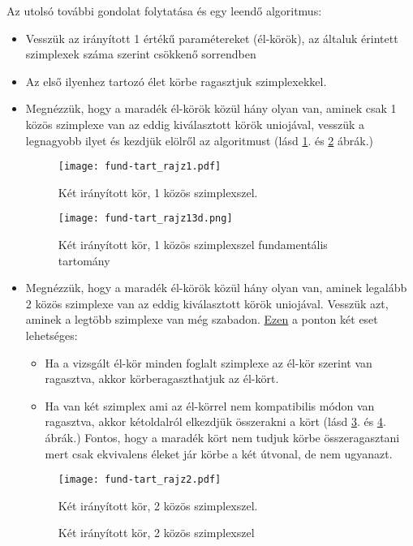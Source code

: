 \documentclass[12pt,magyar,a4paper]{article}
\begin{document}
Az utolsó további gondolat folytatása és egy leendő algoritmus:
\begin{itemize}
  \item Vesszük az irányított 1 értékű paramétereket (él-körök), az általuk
    érintett szimplexek száma szerint csökkenő sorrendben
  \item Az első ilyenhez tartozó élet körbe ragasztjuk szimplexekkel.
  \item Megnézzük, hogy a maradék él-körök közül hány olyan van, aminek csak 1
    közös szimplexe van az eddig kiválasztott körök uniojával, vesszük a
    legnagyobb ilyet és kezdjük elölről az algoritmust (lásd \ref{ftrajz1}. és
    \ref{ftrajz13d} ábrák.)
    \begin{figure}
      \caption{\label{ftrajz1} Két irányított kör, 1 közös szimplexszel.}
      \center
      \texttt{[image: fund-tart\_rajz1.pdf]}
    \end{figure}
    \begin{figure}
      \caption{\label{ftrajz13d} Két irányított kör, 1 közös szimplexszel
      fundamentális tartomány}
      \center
      \texttt{[image: fund-tart\_rajz13d.png]}
    \end{figure}
  \item Megnézzük, hogy a maradék él-körök közül hány olyan van, aminek legalább
    2 közös szimplexe van az eddig kiválasztott körök uniojával. Vesszük azt,
    aminek a legtöbb szimplexe van még szabadon. \underline{Ezen} a ponton két eset
    lehetséges: 
    \begin{itemize}
      \item Ha a vizsgált él-kör minden foglalt szimplexe az él-kör szerint van
	ragasztva, akkor körberagaszthatjuk az él-kört.
      \item Ha van két szimplex ami az él-körrel nem kompatibilis módon van
	ragasztva, akkor kétoldalról elkezdjük összerakni a kört (lásd
	\ref{ftrajz2}. és \ref{ftrajz23d}. ábrák.) Fontos, hogy a maradék kört nem tudjuk körbe
	összeragasztani mert csak ekvivalens éleket jár körbe a két útvonal, de
	nem ugyanazt.
    \end{itemize}
    \begin{figure}
      \caption{\label{ftrajz2} Két irányított kör, 2 közös szimplexszel.}
      \center
      \texttt{[image: fund-tart\_rajz2.pdf]}
    \end{figure}
    \begin{figure}
      \caption{\label{ftrajz23d} Két irányított kör, 2 közös szimplexszel
}
\end{figure}
\end{itemize}
\end{document}
